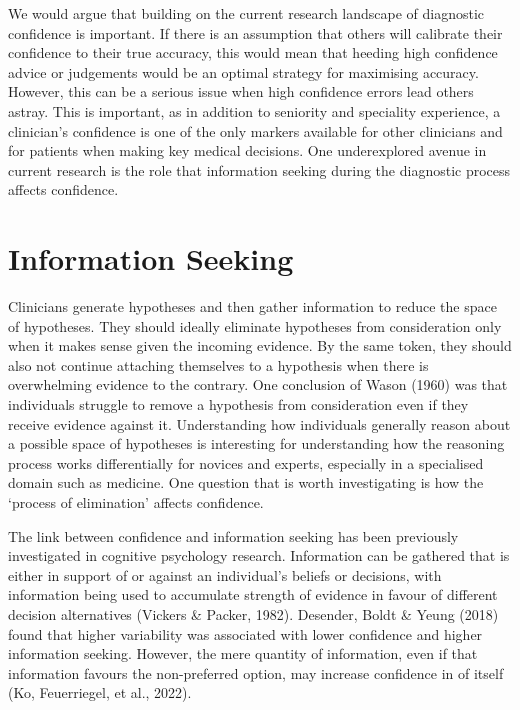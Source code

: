 \documentclass[a4paper, nobind]{templates/ociamthesis}
\begin{document}
We would argue that building on the current research landscape of diagnostic confidence is important. If there is an assumption that others will calibrate their confidence to their true accuracy, this would mean that heeding high confidence advice or judgements would be an optimal strategy for maximising accuracy. However, this can be a serious issue when high confidence errors lead others astray. This is important, as in addition to seniority and speciality experience, a clinician's confidence is one of the only markers available for other clinicians and for patients when making key medical decisions. One underexplored avenue in current research is the role that information seeking during the diagnostic process affects confidence.

\section*{Information Seeking}\label{information-seeking}

Clinicians generate hypotheses and then gather information to reduce the space of hypotheses. They should ideally eliminate hypotheses from consideration only when it makes sense given the incoming evidence. By the same token, they should also not continue attaching themselves to a hypothesis when there is overwhelming evidence to the contrary. One conclusion of Wason (1960) was that individuals struggle to remove a hypothesis from consideration even if they receive evidence against it. Understanding how individuals generally reason about a possible space of hypotheses is interesting for understanding how the reasoning process works differentially for novices and experts, especially in a specialised domain such as medicine. One question that is worth investigating is how the `process of elimination' affects confidence.

The link between confidence and information seeking has been previously investigated in cognitive psychology research. Information can be gathered that is either in support of or against an individual's beliefs or decisions, with information being used to accumulate strength of evidence in favour of different decision alternatives (Vickers \& Packer, 1982). Desender, Boldt \& Yeung (2018) found that higher variability was associated with lower confidence and higher information seeking. However, the mere quantity of information, even if that information favours the non-preferred option, may increase confidence in of itself (Ko, Feuerriegel, et al., 2022).
\end{document}
